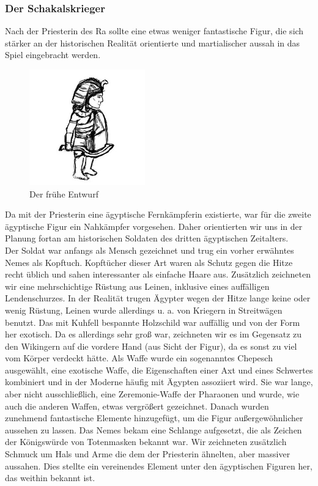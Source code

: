 \documentclass[extern,palatino]{cgBA}
\begin{document}
\subsubsection{Der Schakalskrieger}
Nach der Priesterin des Ra sollte eine etwas weniger fantastische Figur, die sich stärker an der historischen Realität orientierte und martialischer aussah in das Spiel eingebracht werden. 
\begin{figure}[H]
	\centering
	\includegraphics[height=5cm]{jackalalpha.jpg}
	\caption{Der frühe  Entwurf}
	\label{jackalalpha
	}
\end{figure} 
Da mit der Priesterin eine ägyptische Fernkämpferin existierte, war für die zweite ägyptische Figur ein Nahkämpfer vorgesehen. Daher orientierten wir uns in der Planung fortan am historischen Soldaten des dritten ägyptischen Zeitalters.
\\Der Soldat war anfangs als Mensch gezeichnet und trug ein vorher erwähntes Nemes als Kopftuch. Kopftücher dieser Art waren als Schutz gegen die Hitze recht üblich und sahen interessanter als einfache Haare aus. Zusätzlich zeichneten wir eine mehrschichtige Rüstung aus Leinen, inklusive eines auffälligen Lendenschurzes. In der Realität trugen Ägypter wegen der Hitze lange keine oder wenig Rüstung, Leinen wurde allerdings u. a. von Kriegern in Streitwägen benutzt. Das mit Kuhfell bespannte Holzschild war auffällig und von der Form her exotisch. Da es allerdings sehr groß war, zeichneten wir es im Gegensatz zu den Wikingern auf die vordere Hand (aus Sicht der Figur), da es sonst zu viel vom Körper verdeckt hätte. Als Waffe wurde ein sogenanntes Chepesch ausgewählt, eine exotische Waffe, die Eigenschaften einer Axt und eines Schwertes kombiniert und in der Moderne häufig mit Ägypten assoziiert wird. Sie war lange, aber nicht ausschließlich, eine Zeremonie-Waffe der Pharaonen und wurde, wie auch die anderen Waffen, etwas vergrößert gezeichnet. 
Danach wurden zunehmend fantastische Elemente hinzugefügt, um die Figur außergewöhnlicher aussehen zu lassen. Das Nemes bekam eine Schlange aufgesetzt, die als Zeichen der Königswürde von Totenmasken bekannt war. Wir zeichneten zusätzlich Schmuck um Hals und Arme die dem der Priesterin ähnelten, aber massiver aussahen. Dies stellte ein vereinendes Element unter den ägyptischen Figuren her, das weithin bekannt ist. 
\end{document}
